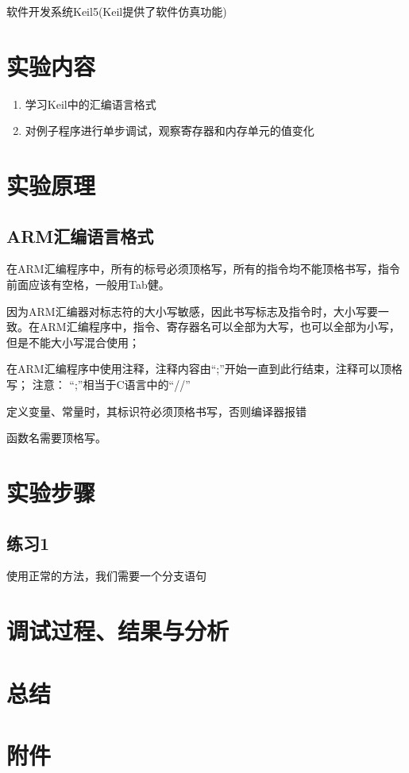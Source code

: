 \documentclass[a4paper,10pt,UTF8]{paper}
\numberwithin{equation}{section}
\numberwithin{figure}{section}
\begin{document}
软件开发系统Keil5(Keil提供了软件仿真功能)

\section{实验内容}

\begin{enumerate}
  \item 学习Keil中的汇编语言格式
  \item 对例子程序进行单步调试，观察寄存器和内存单元的值变化
\end{enumerate}

\section{实验原理}

\subsection{ARM汇编语言格式}

在ARM汇编程序中，所有的标号必须顶格写，所有的指令均不能顶格书写，指令前面应该有空格，一般用Tab健。

因为ARM汇编器对标志符的大小写敏感，因此书写标志及指令时，大小写要一致。在ARM汇编程序中，指令、寄存器名可以全部为大写，也可以全部为小写，但是不能大小写混合使用；

在ARM汇编程序中使用注释，注释内容由“;”开始一直到此行结束，注释可以顶格写；
注意：
	“;”相当于C语言中的“//”

定义变量、常量时，其标识符必须顶格书写，否则编译器报错

函数名需要顶格写。



\section{实验步骤}

\subsection{练习1}

使用正常的方法，我们需要一个分支语句

\section{调试过程、结果与分析}

\section{总结}

\section{附件}
\end{document}
